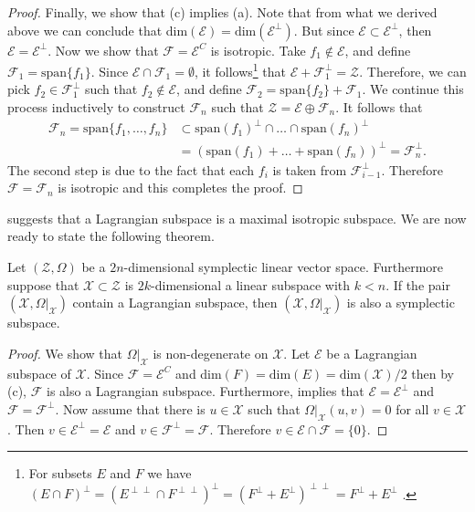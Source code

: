 \begin{proof}
Finally, we show that (c) implies (a). Note that from what we derived above we can conclude that dim$(\mathcal E) = \text{dim}(\mathcal E^{\perp})$. But since $\mathcal E \subset \mathcal E^{\perp}$, then $\mathcal E = \mathcal E^{\perp}$. Now we show that $\mathcal F = \mathcal E^{C}$ is isotropic. Take $f_1 \notin \mathcal E$, and define $\mathcal F_1 = \text{span}\{f_1\}$. Since $\mathcal E \cap \mathcal F_1 = \emptyset$, it follows\footnote{For subsets $E$ and $F$ we have $(E\cap F)^{\perp} = (E^{\perp \perp} \cap F^{\perp \perp})^{\perp} =( F^\perp + E^{\perp})^{\perp \perp} = F^{\perp} + E^\perp$ \cite{abraham1978foundations}.} that $\mathcal E + \mathcal F_1^{\perp} = \mathcal Z$. Therefore, we can pick $f_2\in \mathcal F_1^{\perp}$ such that $f_2\notin \mathcal E$, and define $\mathcal F_2 = \text{span}\{f_2\} + \mathcal F_1$. We continue this process inductively to construct $\mathcal F_n$ such that $\mathcal Z = \mathcal E \oplus \mathcal F_n$. It follows that 
\begin{equation*}
\begin{aligned}
	\mathcal F_n = \text{span}\{f_1,\dots,f_n\} & \subset \text{span}(f_1)^{\perp} \cap \dots \cap \text{span}(f_n)^{\perp} \\
	&= (\text{span}(f_1) + \dots + \text{span}(f_n))^{\perp} =  \mathcal F_n^{\perp}.
\end{aligned}
\end{equation*}
The second step is due to the fact that each $f_i$ is taken from $\mathcal F_{i-1}^{\perp}$. Therefore $\mathcal F = \mathcal F_n$ is isotropic and this completes the proof.
\end{proof}

 suggests that a Lagrangian subspace is a maximal isotropic subspace. We are now ready to state the following theorem.

\begin{theorem} \label{theorem:2.14} \cite{abraham1978foundations}
Let $(\mathcal Z, \Omega)$ be a $2n$-dimensional symplectic linear vector space. Furthermore suppose that $\mathcal X\subset \mathcal Z$ is $2k$-dimensional a linear subspace with $k<n$. If the pair $(\mathcal X,\Omega|_{\mathcal X})$ contain a Lagrangian subspace, then $(\mathcal X,\Omega|_{\mathcal X})$ is also a symplectic subspace.
\end{theorem}
\begin{proof}
We show that $\Omega|_{\mathcal X}$ is non-degenerate on $\mathcal X$. Let $\mathcal E$ be a Lagrangian subspace of $\mathcal X$. Since $\mathcal F = \mathcal E^{C}$ and dim$(F) = \text{dim}(E) = \text{dim}(\mathcal X)/2$ then by  (c), $\mathcal F$ is also a Lagrangian subspace. Furthermore,  implies that $\mathcal E = \mathcal E^{\perp}$ and $\mathcal F = \mathcal F^{\perp}$. Now assume that there is $u\in\mathcal X$ such that $\Omega|_{\mathcal X}(u,v)=0$ for all $v\in \mathcal X$. Then $v\in \mathcal E^{\perp} = \mathcal E$ and $v\in \mathcal F^{\perp} = \mathcal F$. Therefore $v\in\mathcal E \cap \mathcal F = \{ 0 \}$.
\end{proof}

